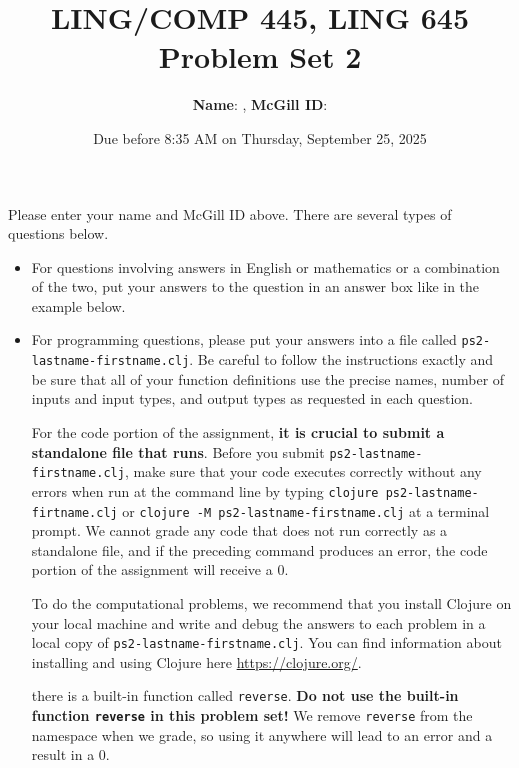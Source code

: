 \documentclass[10pt]{article}
\author{
  \textbf{Name}:       %
, \textbf{McGill ID}:  %
}
\newcommand{\PSnum}{2}
\begin{document}
\title{LING/COMP 445, LING 645\\Problem Set \PSnum}
\date{Due before 8:35 AM on Thursday, September 25, 2025}
\maketitle

Please enter your name and McGill ID above. There are several types of questions
below.

\begin{itemize}
  \item For questions involving answers in English or mathematics or a
    combination of the two, put your answers to the question in an answer box
    like in the example below.
  \item For programming questions, please put your answers into a file called
    \texttt{ps\PSnum-lastname-firstname.clj}. Be careful to follow the
    instructions exactly and be sure that all of your function definitions use
    the precise names, number of inputs and input types, and output types as
    requested in each question.

    For the code portion of the assignment, \textbf{it is crucial to submit a
    standalone file that runs}. Before you submit
    \texttt{ps\PSnum-lastname-firstname.clj},  make sure that your code executes
    correctly without any errors  when run at the command line by typing
    \texttt{clojure ps\PSnum-lastname-firtname.clj} or \texttt{clojure -M ps\PSnum-lastname-firstname.clj} at a terminal prompt. We
    cannot grade any code that does not run correctly as a standalone file, and
    if the preceding command produces an error, the code portion of the
    assignment will receive a $0$.

    To do the computational problems, we recommend that you install Clojure on
    your local machine and write and debug the answers to each problem in a
    local copy of \texttt{ps\PSnum-lastname-firstname.clj}. You can find
    information about installing and using Clojure here
    \url{https://clojure.org/}.

    {\color{red}{Note} there is a built-in function called \texttt{reverse}.
      \textbf{Do not use the built-in function \texttt{reverse} in this problem
      set!} We remove \texttt{reverse} from the namespace when  we grade, so
    using it anywhere will lead to an error and a result in a $0$.}
\end{itemize}
\end{document}
